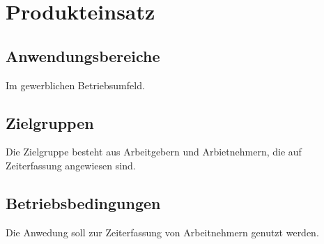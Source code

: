 \section{Produkteinsatz}

\subsection{Anwendungsbereiche}
Im gewerblichen Betriebsumfeld.


\subsection{Zielgruppen}
Die Zielgruppe besteht aus Arbeitgebern und Arbietnehmern, die auf Zeiterfassung angewiesen sind.

\subsection{Betriebsbedingungen}
Die Anwedung soll zur Zeiterfassung von Arbeitnehmern genutzt werden.

